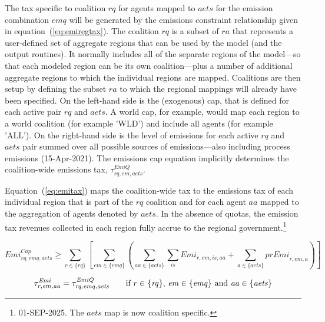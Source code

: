 \documentclass[11pt,letterpaper]{report}
\begin{document}
The tax specific to coalition $\mathit{rq}$ for agents
mapped to $\mathit{aets}$ for the emission combination $\mathit{emq}$ will be generated by the emissions
constraint relationship given in equation~(\ref{eq:emiregtax}).
The coalition $\mathit{rq}$ is
a subset of $\mathit{ra}$ that represents a user-defined set of aggregate
regions that can be used by the model (and the output routines). It normally
includes all of the separate regions of the model---so that each modeled region
can be its own coalition---plus a number of additional aggregate regions to
which the individual regions are mapped. Coalitions are then setup by
defining the subset $\mathit{ra}$ to which the regional mappings will already
have been specified.
On the left-hand side is the (exogenous) cap, that is defined for each
active pair $\mathit{rq}$ and $\mathit{aets}$. A world cap, for example,
would map each region to a world coalition (for example 'WLD') and
include all agents (for example 'ALL'). On the right-hand side
is the level of emissions for each active $\mathit{rq}$ and $\mathit{aets}$
pair summed over all possible sources of emissions---also
including process emissions (15-Apr-2021).
The emissions cap equation implicitly determines the
coalition-wide emissions tax, $\tau^{\mathit{EmiQ}}_{\mathit{rq},\mathit{em},\mathit{aets}}$.

Equation~(\ref{eq:emitax}) maps the coalition-wide tax to the
emissions tax of each individual region that is part of the $\mathit{rq}$
coalition and for each agent $\mathit{aa}$ mapped to the
aggregation of agents denoted by $\mathit{aets}$. In the absence of quotas, the emission tax revenues
collected in each region fully accrue to the regional government.\footnote{01-SEP-2025. The
$\mathit{aets}$ map is now coalition specific.}

\begin{equation}
\label{eq:emiregtax}
\mathit{Emi}^{\mathit{Cap}}_{\mathit{rq},\mathit{emq},\mathit{aets}}
\ge
\sum_{r \in \{ \mathit{rq}\}}
{\left[
\sum_{\mathit{em} \in \{\mathit{emq}\}}
\left( \sum_{\mathit{aa} \in \{\mathit{aets}\}}
\sum_{\mathit{is}} {\mathit{Emi}_{r,\mathit{em},\mathit{is},\mathit{aa}}}
 +
\sum_{\mathit{a} \in \{\mathit{aets}\}}{\mathit{prEmi}_{r,\mathit{em},a}}
\right)
\right]}
\end{equation}

\begin{equation}
\label{eq:emitax}
\tau^{\mathit{Emi}}_{r,\mathit{em},\mathit{aa}} =
   \tau^{\mathit{EmiQ}}_{\mathit{rq},\mathit{emq},\mathit{aets}}
\qquad \textrm{if } r \in \{ \mathit{rq} \} \textrm{, } \mathit{em} \in \{ \mathit{emq} \} \textrm{ and } \mathit{aa} \in \{ \mathit{aets} \}\\
\end{equation}
\end{document}
